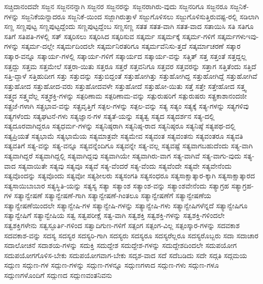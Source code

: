 {ಸಚ್ಚಿದಾನಂದವೇ
ಸಜ್ಜನ
ಸಜ್ಜನನನ್ನಾಗಿ
ಸಜ್ಜನರ
ಸಜ್ಜನರನ್ನು
ಸಜ್ಜನರಾಗಿರು-ವುದು
ಸಜ್ಜನರಿಗೂ
ಸಜ್ಜನರೂ
ಸಜ್ಜನಿಕೆ-ಗಳನ್ನು
ಸಜ್ಜನಿಕೆಯನ್ನಾದರೂ
ಸಜ್ಜನಿಕೆ-ಯಿಂದ
ಸಜ್ಜಾಗಿರುತ್ತಾಳೆ
ಸಜ್ಜುಗೊಳಿಸಲು
ಸಜ್ಜುಗೊಳಿಸುತ್ತಿರುವಷ್ಟ-ರಲ್ಲಿ
ಸಡಿಲಾಗಿ
ಸಣ್ಣ
ಸಣ್ಣಪುಟ್ಟ
ಸಣ್ಣಪುಟ್ಟದ್ದೆಂದು
ಸಣ್ಣಪುಟ್ಟದ್ದೆಂಬ
ಸಣ್ಣಸಣ್ಣ
ಸತತ
ಸತತ-ವಾಗಿ
ಸತತ-ವಾದ
ಸತಾಯಿಸಿ
ಸತಿ
ಸತಿಗೂ
ಸತಿಗೆ
ಸತಿಪತಿ-ಗಳಲ್ಲಿ
ಸತ್
ಸತ್ಕರಿಸಲು
ಸತ್ಕರಿಸಿದ
ಸತ್ಕರಿಸುವ
ಸತ್ಕರ್ಮ
ಸತ್ಕರ್ಮಕ್ಕೆ
ಸತ್ಕರ್ಮ-ಗಳಿಗೆ
ಸತ್ಕರ್ಮಗಳುಇವು-ಗಳನ್ನು
ಸತ್ಕರ್ಮ-ದಲ್ಲೇ
ಸತ್ಕರ್ಮದಿಂದಲೇ
ಸತ್ಕರ್ಮನಿರತರಿಗೂ
ಸತ್ಕರ್ಮವೆನಿಸು-ತ್ತದೆ
ಸತ್ಕರ್ಮಾಚರಣೆ
ಸತ್ಕಾರ
ಸತ್ಕಾರ-ವನ್ನೂ
ಸತ್ಕಾರ್ಯ-ಗಳಲ್ಲಿ
ಸತ್ಕಾರ್ಯ-ಗಳಿಗೆ
ಸತ್ಕಾರ್ಯದ
ಸತ್ಕಾರ್ಯ-ವನ್ನು
ಸತ್ಚಿತ್
ಸತ್ತ
ಸತ್ತಂತೆ
ಸತ್ತದ್ದಲ್ಲ
ಸತ್ತದ್ದು
ಸತ್ತಮ
ಸತ್ತಮೇಲೆ
ಸತ್ತರಾ-ಯಿತು
ಸತ್ತರೂ
ಸತ್ತರೆ
ಸತ್ತವನಿಗೂ
ಸತ್ತವರ
ಸತ್ತವರನ್ನು
ಸತ್ತಾಗ
ಸತ್ತಿತೆಂದು
ಸತ್ತಿದೆ
ಸತ್ತಿ-ದ್ದಾಳೆ
ಸತ್ತಿಹುದೀಗ
ಸತ್ತು
ಸತ್ತುದನ್ನು
ಸತ್ತುಬಿದ್ದಂತೆ
ಸತ್ತುಹೋಗಿತ್ತು
ಸತ್ತುಹೋಗಿದ್ದ
ಸತ್ತುಹೋಗಿದ್ದೆ
ಸತ್ತುಹೋಗಿವೆ
ಸತ್ತುಹೋದ
ಸತ್ತುಹೋದ-ವರು
ಸತ್ತುಹೋದವಳೇ
ಸತ್ತುಹೋದೆ
ಸತ್ತುಹೋ-ಯಿತು
ಸತ್ತೆ
ಸತ್ತೇ
ಸತ್ತೇಹೋದ
ಸತ್ತ್ವ
ಸತ್ತ್ವದ
ಸತ್ತ್ವವೆಲ್ಲ
ಸತ್ತ್ವಶಕ್ತಿ-ಗಳನ್ನು
ಸತ್ಪರಿಣಾಮ
ಸತ್ಪರಿಣಾಮ-ವನ್ನು
ಸತ್ಪುರುಷರಿಗೆ
ಸತ್ಪುರುಷರು
ಸತ್ಪ್ರಕಾಶಾನಂದಜೀ
ಸತ್ಪ್ರಜೆ-ಗಳಾಗಿ
ಸತ್ಪ್ರಭಾವ-ವನ್ನು
ಸತ್ಪ್ರವೃತ್ತಿಗೆ
ಸತ್ಫಲ-ಗಳನ್ನು
ಸತ್ಫಲ-ವನ್ನು
ಸತ್ಯ
ಸತ್ಯಂ
ಸತ್ಯಕ್ಕೆ
ಸತ್ಯ-ಗಳನ್ನು
ಸತ್ಯಗಳಿವು
ಸತ್ಯಗಳೆಂದು
ಸತ್ಯಘಟನೆ-ಗಳು
ಸತ್ಯಜ್ಞಾನ-ಗಳ
ಸತ್ಯತೆ-ಯನ್ನು
ಸತ್ಯತ್ವ
ಸತ್ಯದ
ಸತ್ಯದರ್ಶನ
ಸತ್ಯ-ದಲ್ಲಿ
ಸತ್ಯದೂರವಾಗಿದ್ದರೂ
ಸತ್ಯಧರ್ಮ-ಗಳನ್ನು
ಸತ್ಯನಿಷ್ಠರಾಗಿ
ಸತ್ಯನಿಷ್ಠ-ರಾದ
ಸತ್ಯನಿಷ್ಠರೂ
ಸತ್ಯನಿಷ್ಠೆ
ಸತ್ಯಪಥ-ದಲ್ಲಿ
ಸತ್ಯಪ್ರಿಯತೆ
ಸತ್ಯಭಾಮೆ
ಸತ್ಯಭಾಮೆಯ
ಸತ್ಯಮಾತ್ರವೇ
ಸತ್ಯಮೇವ
ಸತ್ಯವಂತ
ಸತ್ಯವಂತನು
ಸತ್ಯವಂತರೂ
ಸತ್ಯವತಿ
ಸತ್ಯವತಿಗೆ
ಸತ್ಯ-ವನ್ನು
ಸತ್ಯ-ವನ್ನೂ
ಸತ್ಯವನ್ನೆಂದಿಗೂ
ಸತ್ಯವನ್ನೇ
ಸತ್ಯ-ವಲ್ಲ
ಸತ್ಯವಷ್ಟೆ
ಸತ್ಯವಾಗಬಹುದೆಂದು
ಸತ್ಯ-ವಾಗಿ
ಸತ್ಯವಾಗಿದ್ದರೆ
ಸತ್ಯವಾಗಿದ್ದಲ್ಲಿ
ಸತ್ಯವಾಗಿದ್ದವು
ಸತ್ಯವಾಗಿಯೇ
ಸತ್ಯವಾಗಿರು-ವಾಗ
ಸತ್ಯ-ವಾಗಿವೆ
ಸತ್ಯ-ವಾಗು-ವುದು
ಸತ್ಯ-ವಾದ
ಸತ್ಯವಾಯಿತೇ
ಸತ್ಯವು
ಸತ್ಯವೂ
ಸತ್ಯವೆ
ಸತ್ಯ-ವೆಂದರೆ
ಸತ್ಯ-ವೆಂದು
ಸತ್ಯವೆಂದೇ
ಸತ್ಯವೇ
ಸತ್ಯವೇನೆಂದು
ಸತ್ಯವೊಂದನ್ನು
ಸತ್ಯವೊಂದು
ಸತ್ಯವೋ
ಸತ್ಯಶೀಲರು
ಸತ್ಯಸಂಗತಿ
ಸತ್ಯಸಂಧರೂ
ಸತ್ಯಸಾಕ್ಷಾತ್ಕಾರ-ಕ್ಕಾಗಿ
ಸತ್ಯಸಾಕ್ಷಾತ್ಕಾರದ
ಸತ್ಯಸಾಯಿಬಾಬಾರ
ಸತ್ಯಸ್ಥಿತಿ-ಯನ್ನು
ಸತ್ಯಸ್ಯ
ಸತ್ಯಾ
ಸತ್ಯಾಂಶ
ಸತ್ಯಾಂಶ-ವನ್ನು
ಸತ್ಯಾಂಶವೇನೆಂದು
ಸತ್ಯಾಗ್ರಹ
ಸತ್ಯಾಗ್ರಹ-ಗಳ
ಸತ್ಯಾನ್ವೇಷಣೆ
ಸತ್ಯಾನ್ವೇಷಣೆ-ಗಾಗಿ
ಸತ್ಯಾನ್ವೇಷಣೆ-ಗಿಂತಲೂ
ಸತ್ಯಾನ್ವೇಷಣೆಗೆ
ಸತ್ಯಾನ್ವೇಷಣೆಯ
ಸತ್ಯಾನ್ವೇಷಣೆಯಿಂದಲೇ
ಸತ್ಯಾನ್ವೇಷಿ-ಗಳ
ಸತ್ಯಾನ್ವೇಷಿ-ಗಳನ್ನು
ಸತ್ಯಾನ್ವೇಷಿ-ಗಳು
ಸತ್ಯಾನ್ವೇಷಿಗಳೆನ್ನದೆ
ಸತ್ಯಾನ್ವೇಷಿಗೂ
ಸತ್ಯಾನ್ವೇಷಿಗೆ
ಸತ್ಯಾನ್ವೇಷಿಯ
ಸತ್ವ
ಸತ್ವಪರೀಕ್ಷೆ
ಸತ್ವ-ವಾಗಿ
ಸತ್ವಶಕ್ತಿ
ಸತ್ವಶಕ್ತಿ-ಗಳನ್ನು
ಸತ್ವಶಕ್ತಿ-ಗಳಿಂದಲೇ
ಸತ್ವಶಕ್ತಿಗಳೇನು
ಸತ್ವಸ್ಫೂರ್ತಿ-ಗಳಿಂದ
ಸತ್ವಾದಿಗುಣ-ಗಳಿಗೆ
ಸತ್ಸಂಗ
ಸತ್ಸಂಗ-ವಿಲ್ಲ
ಸತ್ಸಂಸ್ಕಾರ-ಗಳನ್ನು
ಸದವಕಾಶ
ಸದವಕಾಶ-ವನ್ನು
ಸದಸ್ಯ
ಸದಸ್ಯರ
ಸದಸ್ಯರಿ-ಗಾಗಿ
ಸದಸ್ಯರು
ಸದಸ್ಯರೂ
ಸದಸ್ಯರೆಲ್ಲರೂ
ಸದಸ್ಯರೊಬ್ಬರು
ಸದಾ
ಸದಾಚಾರ
ಸದಾಲೋಚನೆ
ಸದಾಶಯ-ಗಳನ್ನು
ಸದುಕ್ತಿ
ಸದುದ್ದೇಶ
ಸದುದ್ದೇಶ-ಗಳನ್ನು
ಸದುದ್ದೇಶದಿಂದಲೇ
ಸದುಪಯೋಗ
ಸದುಪಯೋಗಗೊಳಿಸ-ಬೇಕು
ಸದುಪಯೋಗವಾಗ-ಬೇಕು
ಸದೃಶ-ವಾದ
ಸದೆ
ಸದೆಬಡಿದು
ಸದೇ
ಸದ್ಗತಿ
ಸದ್ಗಮಯ
ಸದ್ಗುಣ
ಸದ್ಗುಣ-ಗಳ
ಸದ್ಗುಣ-ಗಳನ್ನು
ಸದ್ಗುಣ-ಗಳನ್ನೂ
ಸದ್ಗುಣಗಳಾದ
ಸದ್ಗುಣ-ಗಳು
ಸದ್ಗುಣ-ಗಳೂ
ಸದ್ಗುಣಗಳೊಂದಿಗೆ
ಸದ್ಗುಣದ
ಸದ್ಗುಣವಂತನಿವನು
}
